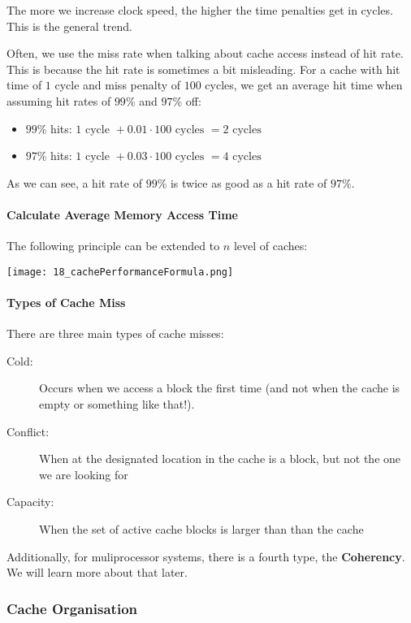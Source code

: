 The more we increase clock speed, the higher the time penalties get in cycles. This is the general trend.

Often, we use the miss rate when talking about cache access instead of hit rate. This is because the hit rate is sometimes a bit misleading. For a cache with hit time of $1$ cycle and miss penalty of $100$ cycles, we get an average hit time when assuming hit rates of $99$\% and $97$\% off:
\begin{itemize}
    \item $99$\% hits: $1 \text{ cycle } + 0.01 \cdot 100 \text{ cycles } = 2 \text{ cycles}$
    \item $97$\% hits: $1 \text{ cycle } + 0.03 \cdot 100 \text{ cycles } = 4 \text{ cycles}$
\end{itemize}

As we can see, a hit rate of $99$\% is twice as good as a hit rate of $97$\%.

\paragraph{Calculate Average Memory Access Time}
The following principle can be extended to $n$ level of caches:

\texttt{[image: 18\_cachePerformanceFormula.png]}

\paragraph{Types of Cache Miss}
There are three main types of cache misses:

\begin{description}
    \item[Cold:] Occurs when we access a block the first time (and not when the cache is empty or something like that!).
    \item[Conflict:] When at the designated location in the cache is a block, but not the one we are looking for
    \item[Capacity:] When the set of active cache blocks is larger than than the cache
\end{description}
Additionally, for muliprocessor systems, there is a fourth type, the \textbf{Coherency}. We will learn more about that later.

\subsubsection{Cache Organisation}


